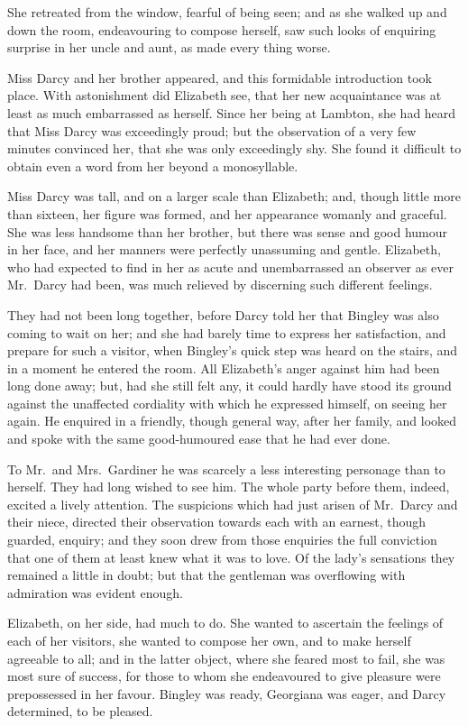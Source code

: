 She retreated from the window, fearful of being seen;
and as she walked up and down the room, endeavouring
to compose herself, saw such looks of enquiring surprise
in her uncle and aunt, as made every thing worse.

Miss Darcy and her brother appeared, and this formidable
introduction took place. With astonishment did
Elizabeth see, that her new acquaintance was at least
as much embarrassed as herself. Since her being at
Lambton, she had heard that Miss Darcy was exceedingly
proud; but the observation of a very few minutes convinced
her, that she was only exceedingly shy. She found
it difficult to obtain even a word from her beyond a
monosyllable.

Miss Darcy was tall, and on a larger scale than Elizabeth;
and, though little more than sixteen, her figure
was formed, and her appearance womanly and graceful.
She was less handsome than her brother, but there was
sense and good humour in her face, and her manners were
perfectly unassuming and gentle. Elizabeth, who had
expected to find in her as acute and unembarrassed an
observer as ever Mr.\ Darcy had been, was much relieved
by discerning such different feelings.

They had not been long together, before Darcy told her
that Bingley was also coming to wait on her; and she
had barely time to express her satisfaction, and prepare
for such a visitor, when Bingley’s quick step was heard
on the stairs, and in a moment he entered the room. All
Elizabeth’s anger against him had been long done away;
but, had she still felt any, it could hardly have stood its
ground against the unaffected cordiality with which he
expressed himself, on seeing her again. He enquired in
a friendly, though general way, after her family, and looked
and spoke with the same good-humoured ease that he had
ever done.

To Mr.\ and Mrs.\ Gardiner he was scarcely a less interesting
personage than to herself. They had long wished to
see him. The whole party before them, indeed, excited
a lively attention. The suspicions which had just arisen
of Mr.\ Darcy and their niece, directed their observation
towards each with an earnest, though guarded, enquiry;
and they soon drew from those enquiries the full conviction
that one of them at least knew what it was to love. Of
the lady’s sensations they remained a little in doubt;
but that the gentleman was overflowing with admiration
was evident enough.

Elizabeth, on her side, had much to do. She wanted
to ascertain the feelings of each of her visitors, she wanted
to compose her own, and to make herself agreeable to all;
and in the latter object, where she feared most to fail,
she was most sure of success, for those to whom she
endeavoured to give pleasure were prepossessed in her
favour. Bingley was ready, Georgiana was eager, and
Darcy determined, to be pleased.


